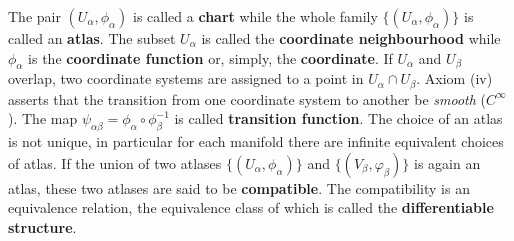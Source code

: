 \documentclass[../main/main.tex]{subfiles}
\begin{document}
\begin{definition}[Manifold]{}
\begin{enumerate}
\begin{figure}[H]
\end{figure}
\end{enumerate}
The pair $(U_\alpha, \phi_\alpha)$ is called a \textbf{chart} while the whole family $\{(U_\alpha, \phi_\alpha)\}$ is called an \textbf{atlas}. The subset $U_\alpha$ is called the \textbf{coordinate neighbourhood} while $\phi_\alpha$ is the \textbf{coordinate function} or, simply, the \textbf{coordinate}. If $U_\alpha$ and $U_\beta$ overlap, two coordinate systems are assigned to a point in $U_\alpha\cap U_\beta$. Axiom (iv) asserts that the transition from one coordinate system to another be \emph{smooth} ($C^\infty$). The map $\psi_{\alpha\beta}=\phi_\alpha\circ\phi_\beta^{-1}$ is called \textbf{transition function}. The choice of an atlas is not unique, in particular for each manifold there are infinite equivalent choices of atlas. If the union of two atlases $\{(U_\alpha, \phi_\alpha)\}$ and $\{(V_\beta, \varphi_\beta)\}$ is again an atlas, these two atlases are said to be \textbf{compatible}. The compatibility is an equivalence relation, the equivalence class of which is called the \textbf{differentiable structure}.
\end{definition}
\end{document}
